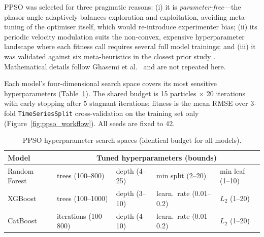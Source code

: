 PPSO was selected for three pragmatic reasons: (i) it is \emph{parameter-free}---the phasor angle adaptively balances exploration and exploitation, avoiding meta-tuning of the optimiser itself, which would re-introduce experimenter bias; (ii) its periodic velocity modulation suits the non-convex, expensive hyperparameter landscape where each fitness call requires several full model trainings; and (iii) it was validated against six meta-heuristics in the closest prior study \parencite{zhang2023catboostppso}. Mathematical details follow Ghasemi et al.\ \parencite{ghasemi2019ppso} and are not repeated here.

Each model's four-dimensional search space covers its most sensitive hyperparameters (Table~\ref{tab:search_spaces}). The shared budget is 15 particles $\times$ 20 iterations with early stopping after 5 stagnant iterations; fitness is the mean RMSE over 3-fold \texttt{TimeSeriesSplit} cross-validation on the training set only (Figure~\ref{fig:ppso_workflow}). All seeds are fixed to 42.

\begin{table}[H]
\centering
\caption{PPSO hyperparameter search spaces (identical budget for all models).}
\label{tab:search_spaces}
\small
\begin{tabular}{@{}lllll@{}}
\toprule
\textbf{Model} & \multicolumn{4}{c}{\textbf{Tuned hyperparameters (bounds)}} \\
\midrule
Random Forest & trees (100--800) & depth (4--25) & min split (2--20) & min leaf (1--10) \\
XGBoost & trees (100--1000) & depth (3--10) & learn.\ rate (0.01--0.2) & $L_2$ (1--20) \\
CatBoost & iterations (100--800) & depth (4--10) & learn.\ rate (0.01--0.2) & $L_2$ (1--20) \\
\bottomrule
\end{tabular}
\end{table}

